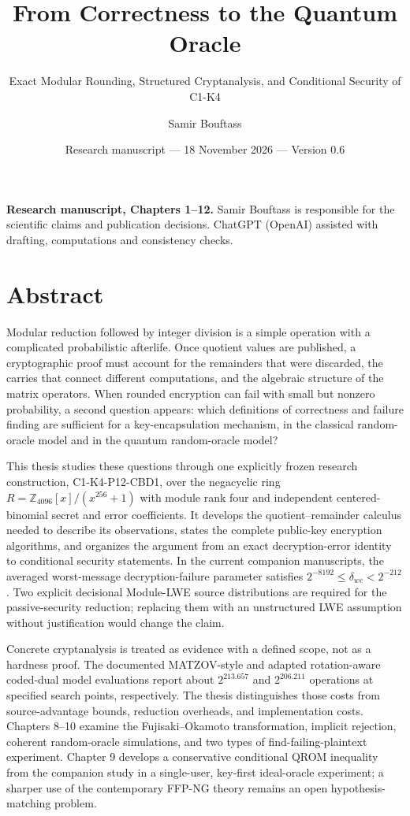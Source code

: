 \documentclass[
  11pt,
  a4paper,
  oneside]{report}
\title{From Correctness to the Quantum Oracle}
\subtitle{Exact Modular Rounding, Structured Cryptanalysis, and
Conditional Security of C1-K4}
\author{Samir Bouftass}
\date{Research manuscript --- 18 November 2026 --- Version 0.6}
\begin{document}
\maketitle

{
\hypersetup{linkcolor=}
\setcounter{tocdepth}{2}
\tableofcontents
}
\textbf{Research manuscript, Chapters 1--12.} Samir Bouftass is
responsible for the scientific claims and publication decisions. ChatGPT
(OpenAI) assisted with drafting, computations and consistency checks.

\chapter*{Abstract}\label{abstract}

Modular reduction followed by integer division is a simple operation
with a complicated probabilistic afterlife. Once quotient values are
published, a cryptographic proof must account for the remainders that
were discarded, the carries that connect different computations, and the
algebraic structure of the matrix operators. When rounded encryption can
fail with small but nonzero probability, a second question appears:
which definitions of correctness and failure finding are sufficient for
a key-encapsulation mechanism, in the classical random-oracle model and
in the quantum random-oracle model?

This thesis studies these questions through one explicitly frozen
research construction, C1-K4-P12-CBD1, over the negacyclic ring
\(R=\mathbb Z_{4096}[x]/(x^{256}+1)\) with module rank four and
independent centered-binomial secret and error coefficients. It develops
the quotient--remainder calculus needed to describe its observations,
states the complete public-key encryption algorithms, and organizes the
argument from an exact decryption-error identity to conditional security
statements. In the current companion manuscripts, the averaged
worst-message decryption-failure parameter satisfies
\(2^{-8192}\le\delta_{wc}<2^{-212}\). Two explicit decisional Module-LWE
source distributions are required for the passive-security reduction;
replacing them with an unstructured LWE assumption without justification
would change the claim.

Concrete cryptanalysis is treated as evidence with a defined scope, not
as a hardness proof. The documented MATZOV-style and adapted
rotation-aware coded-dual model evaluations report about \(2^{213.657}\)
and \(2^{206.211}\) operations at specified search points, respectively.
The thesis distinguishes those costs from source-advantage bounds,
reduction overheads, and implementation costs. Chapters 8--10 examine
the Fujisaki--Okamoto transformation, implicit rejection, coherent
random-oracle simulations, and two types of find-failing-plaintext
experiment. Chapter 9 develops a conservative conditional QROM
inequality from the companion study in a single-user, key-first
ideal-oracle experiment; a sharper use of the contemporary FFP-NG theory
remains an open hypothesis-matching problem.
\end{document}

